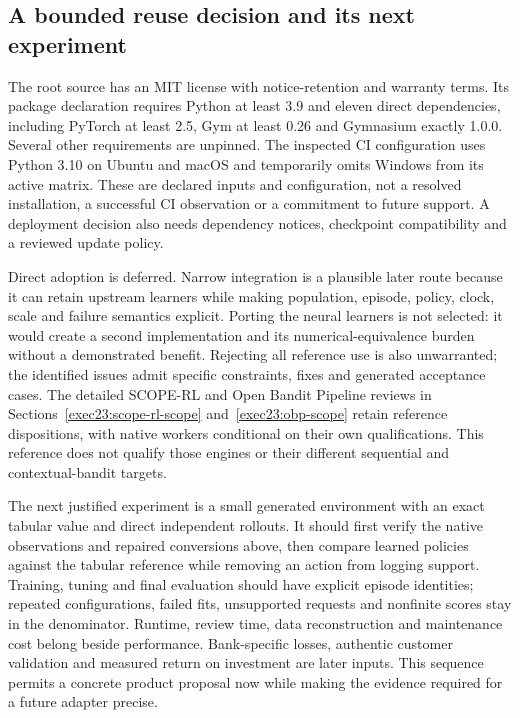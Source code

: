 \subsection{A bounded reuse decision and its next experiment}

The root source has an MIT license with notice-retention and warranty terms.
Its package declaration requires Python at least 3.9 and eleven direct
dependencies, including PyTorch at least 2.5, Gym at least 0.26 and Gymnasium
exactly 1.0.0. Several other requirements are unpinned. The inspected CI
configuration uses Python 3.10 on Ubuntu and macOS and temporarily omits
Windows from its active matrix. These are declared inputs and configuration,
not a resolved installation, a successful CI observation or a commitment to
future support. A deployment decision also needs dependency notices,
checkpoint compatibility and a reviewed update policy.
\citep{exec15_d3rlpy_package}

Direct adoption is deferred. Narrow integration is a plausible later route
because it can retain upstream learners while making population, episode,
policy, clock, scale and failure semantics explicit. Porting the neural
learners is not selected: it would create a second implementation and its
numerical-equivalence burden without a demonstrated benefit. Rejecting all
reference use is also unwarranted; the identified issues admit specific
constraints, fixes and generated acceptance cases. The detailed SCOPE-RL and
Open Bandit Pipeline reviews in Sections~\ref{exec23:scope-rl-scope}
and~\ref{exec23:obp-scope} retain reference dispositions, with native workers
conditional on their own qualifications. This reference does not qualify
those engines or their different sequential and contextual-bandit targets. \citep{exec15_d3rlpy_contract}

The next justified experiment is a small generated environment with an exact
tabular value and direct independent rollouts. It should first verify the
native observations and repaired conversions above, then compare learned
policies against the tabular reference while removing an action from logging
support. Training, tuning and final evaluation should have explicit episode
identities; repeated configurations, failed fits, unsupported requests and
nonfinite scores stay in the denominator. Runtime, review time, data
reconstruction and maintenance cost belong beside performance. Bank-specific
losses, authentic customer validation and measured return on investment are
later inputs. This sequence permits a concrete product proposal now while
making the evidence required for a future adapter precise.
\citep{exec15_d3rlpy_contract}

